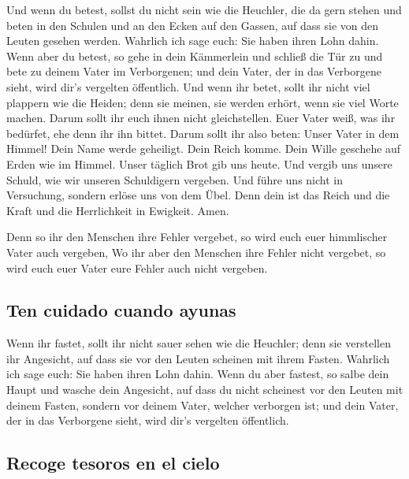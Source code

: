 Und wenn du betest, sollst du nicht sein wie die
Heuchler, die da gern stehen und beten in den Schulen und an den Ecken
auf den Gassen, auf dass sie von den Leuten gesehen werden. Wahrlich ich
sage euch: Sie haben ihren Lohn dahin.  Wenn aber du
betest, so gehe in dein Kämmerlein und schließ die Tür zu und bete zu
deinem Vater im Verborgenen; und dein Vater, der in das Verborgene
sieht, wird dir's vergelten öffentlich.  Und wenn ihr
betet, sollt ihr nicht viel plappern wie die Heiden; denn sie meinen,
sie werden erhört, wenn sie viel Worte machen.  Darum
sollt ihr euch ihnen nicht gleichstellen. Euer Vater weiß, was ihr
bedürfet, ehe denn ihr ihn bittet.  Darum sollt ihr also
beten: Unser Vater in dem Himmel! Dein Name werde geheiligt.
 Dein Reich komme. Dein Wille geschehe auf Erden wie im
Himmel.  Unser täglich Brot gib uns heute.
 Und vergib uns unsere Schuld, wie wir unseren
Schuldigern vergeben.  Und führe uns nicht in Versuchung,
sondern erlöse uns von dem Übel. Denn dein ist das Reich und die Kraft
und die Herrlichkeit in Ewigkeit. Amen.

 Denn so ihr den Menschen ihre Fehler vergebet, so wird
euch euer himmlischer Vater auch vergeben,  Wo ihr aber
den Menschen ihre Fehler nicht vergebet, so wird euch euer Vater eure
Fehler auch nicht vergeben.

\hypertarget{ten-cuidado-cuando-ayunas}{%
\subsection{Ten cuidado cuando ayunas}\label{ten-cuidado-cuando-ayunas}}

 Wenn ihr fastet, sollt ihr nicht sauer sehen wie die
Heuchler; denn sie verstellen ihr Angesicht, auf dass sie vor den Leuten
scheinen mit ihrem Fasten. Wahrlich ich sage euch: Sie haben ihren Lohn
dahin.  Wenn du aber fastest, so salbe dein Haupt und
wasche dein Angesicht,  auf dass du nicht scheinest vor
den Leuten mit deinem Fasten, sondern vor deinem Vater, welcher
verborgen ist; und dein Vater, der in das Verborgene sieht, wird dir's
vergelten öffentlich.

\hypertarget{recoge-tesoros-en-el-cielo}{%
\subsection{Recoge tesoros en el
cielo}\label{recoge-tesoros-en-el-cielo}}

